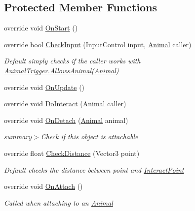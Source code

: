 \subsection*{Protected Member Functions}
\begin{DoxyCompactItemize}
\item 
override void \mbox{\hyperlink{class_ladder_object_a2b6508ecfa48b616813c22c113650637}{On\+Start}} ()
\item 
override bool \mbox{\hyperlink{class_ladder_object_aa18c443d78ab35fa3aba0d6ce7328539}{Check\+Input}} (Input\+Control input, \mbox{\hyperlink{class_animal}{Animal}} caller)
\begin{DoxyCompactList}\small\item\em Default simply checks if the {\itshape caller}  works with \mbox{\hyperlink{class_animal_trigger_ae8394dfcf5f91b8c413959a4d6baa3a9}{Animal\+Trigger.\+Allows\+Animal(\+Animal)}} \end{DoxyCompactList}\item 
override void \mbox{\hyperlink{class_ladder_object_a0ea09ce266154cd7be7ddb15c7f31874}{On\+Update}} ()
\item 
override void \mbox{\hyperlink{class_ladder_object_ad7c09ffac9842f0a4ffb799f5caa78cf}{Do\+Interact}} (\mbox{\hyperlink{class_animal}{Animal}} caller)
\item 
override void \mbox{\hyperlink{class_ladder_object_a0d40bcecf87fe56cd97b5550d352e258}{On\+Detach}} (\mbox{\hyperlink{class_animal}{Animal}} animal)
\begin{DoxyCompactList}\small\item\em summary$>$Check if this object is attachable\end{DoxyCompactList}\item 
override float \mbox{\hyperlink{class_ladder_object_a9199b2da6f97c758e595a4ccdf7c98b0}{Check\+Distance}} (Vector3 point)
\begin{DoxyCompactList}\small\item\em Default checks the distance between {\itshape point}  and \mbox{\hyperlink{class_attachable_interact_ad46e0ca3808d58ab5e1102e379d6cb7e}{Interact\+Point}} \end{DoxyCompactList}\item 
override void \mbox{\hyperlink{class_ladder_object_ae0bd6ffec9b6cd52fa349df754d2f1fa}{On\+Attach}} ()
\begin{DoxyCompactList}\small\item\em Called when attaching to an \mbox{\hyperlink{class_animal}{Animal}}\end{DoxyCompactList}\end{DoxyCompactItemize}
